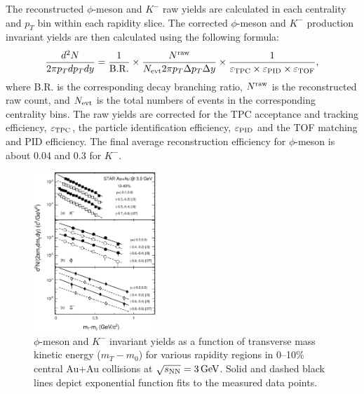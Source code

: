 \documentclass[%
 reprint,	
showpacs,
 amsmath,amssymb,
 aps,
 prc,
]{revtex4-1}
\begin{document}
The reconstructed $\phi$-meson and $K^-$ raw yields are calculated in each centrality and $p_{T}$ bin within each rapidity slice. The corrected $\phi$-meson and $K^-$ production invariant yields are then calculated using the following formula:
\begin{equation*}
  \begin{aligned}
 \frac{d^2N}{2\pi p_{T}dp_{T}dy} = \frac{1}{\rm B.R.} \times \frac{N^{\rm raw}}{N_{\rm evt} 2\pi p_{T}\Delta p_{T}\Delta y} \times \frac{1}{\varepsilon_{\rm TPC}\times\varepsilon_{\rm PID}\times\varepsilon_{\rm TOF}},
  \end{aligned}
\label{equ:invariantyield}
\end{equation*}
where B.R. is the corresponding decay branching ratio, $N^{\rm raw}$ is the reconstructed raw count, and $N_{\rm evt}$ is the total numbers of events in the corresponding centrality bins. The raw yields are corrected for the TPC acceptance and tracking efficiency, $\varepsilon_{\rm TPC}$, the particle identification efficiency, $\varepsilon_{\rm PID}$ and the TOF matching and PID efficiency. The final average reconstruction efficiency for $\phi$-meson is about 0.04 and 0.3 for $K^-$.

\begin{figure}
\centering
\includegraphics[width=0.41\textwidth]{fig/fig2_h_mT_spectra_phiMeson.eps}
  \caption{ $\phi$-meson and $K^-$ invariant yields as a function of transverse mass kinetic energy ($m_T-m_0$) for various rapidity regions in 0--10\% central Au+Au collisions at ${\sqrt{s_{\rm NN}} = \rm{3\,GeV}}$. Solid and dashed black lines depict exponential function fits to the measured data points.}
\label{fig:phimTSpectra} 
\end{figure}
\end{document}
